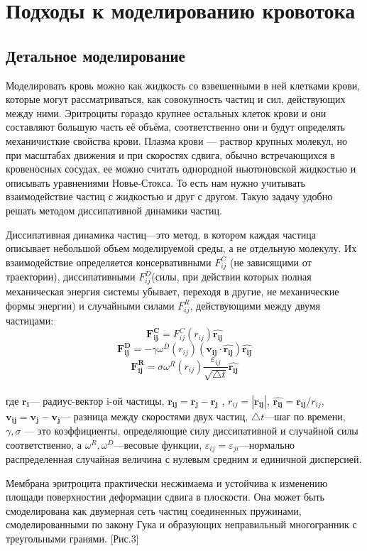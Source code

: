 \section{Подходы к моделированию кровотока}
\subsection{Детальное моделирование}
Моделировать кровь можно как жидкость со взвешенными в ней клетками крови, которые могут рассматриваться, как совокупность частиц и сил, действующих между ними. Эритроциты гораздо крупнее остальных клеток крови и они составляют большую часть её объёма, соответственно они и будут определять механичисткие свойства крови. Плазма крови — раствор крупных молекул, но при масштабах движения и при скоростях сдвига, обычно встречающихся в кровеносных сосудах, ее можно считать однородной ньютоновской жидкостью  и описывать уравнениями Новье-Стокса. То есть нам нужно учитывать взаимодействие частиц с жидкостью и друг с другом. Такую задачу удобно решать методом диссипативной динамики частиц.

Диссипативная динамика частиц—это метод, в котором каждая частица описывает небольшой объем моделируемой среды, а не отдельную молекулу. Их взаимодействие определяется консервативными $F^C_{ij}$ (не зависящими от 
траектории), диссипативными $F^D_{ij}$(силы, при действии которых полная механическая энергия  системы убывает, переходя в другие, не механические формы энергии) и случайными силами $F^R_{ij}$, действующими между двумя частицами:
$$
\mathbf{F^C_{ij}}=F^C_{ij}(r_{ij})\mathbf{\hat{r_{ij}}}
$$
$$
\mathbf{F^D_{ij}}=-\gamma \omega^D(r_{ij}) (\mathbf{v_{ij}} \cdot \mathbf{\hat{r_{ij}}})\mathbf{\hat{r_{ij}}}
$$
$$
\mathbf{F^R_{ij}}=\sigma \omega^R(r_{ij}) \dfrac{\varepsilon_{ij}}{\sqrt{\bigtriangleup t}} \mathbf{\hat{r_{ij}}}
$$\\
где $\mathbf{r_{i}}$— радиус-вектор i-ой частицы, $\mathbf{r_{ij}}=\mathbf{r_{j}} - \mathbf{r_{j}}$ ,
$r_{ij}=|\mathbf{r_{ij}}|$,
$\mathbf{\hat{r_{ij}}}=\mathbf{r_{ij}}/{r_{ij}}$,
$\mathbf{v_{ij}}=\mathbf{v_{j} - \mathbf{v_{j}}}$— разница между скоростями двух частиц, $\bigtriangleup t$—шаг по времени, $\gamma, \sigma$ — это  коэффициенты, определяющие силу диссипативной и случайной силы соответственно, а $\omega^R,\omega^D$—весовые функции,
${\varepsilon_{ij}={\varepsilon_{ji}}}$—нормально распределенная случайная величина с нулевым средним и единичной дисперсией.

Мембрана эритроцита практически несжимаема и устойчива к изменению площади поверхностии деформации сдвига в плоскости. Она может быть смоделирована как двумерная сеть частиц соединенных пружинами, смоделированными по закону Гука и образующих неправильный многогранник с треугольными гранями. [Рис.3]

